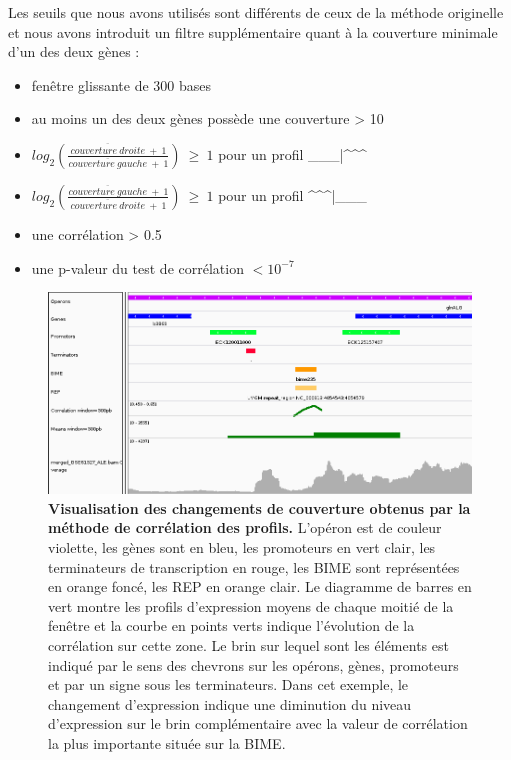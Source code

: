 \documentclass[12pt,a4paper]{report}
\begin{document}
\begin{onehalfspace}
Les seuils que nous avons utilisés sont différents de ceux de la méthode originelle et nous avons introduit un filtre supplémentaire quant à la couverture minimale d'un des deux gènes : 
\begin{itemize}[label=$\bullet$]
\item fenêtre glissante de 300 bases
\item au moins un des deux gènes possède une couverture > 10
\item $log_2(\frac{\overline{couverture~droite}~+~1}{\overline{couverture~gauche}~+~1})~\geq~1$ pour un profil \_\_\_|\^{ }\^{ }\^{ }
\item $log_2(\frac{\overline{couverture~gauche}~+~1}{\overline{couverture~droite}~+~1})~\geq~1$ pour un profil \^{ }\^{ }\^{ }|\_\_\_
\item une corrélation > 0.5
\item une p-valeur du test de corrélation $< 10^{-7}$
\end{itemize}

\begin{figure}[!h]
\centerline{\includegraphics[scale=0.53]{figures/igv_profil.png}}
\caption{\textbf{Visualisation des changements de couverture obtenus par la méthode de corrélation des profils.} L'opéron est de couleur violette, les gènes sont en bleu, les promoteurs en vert clair, les terminateurs de transcription en rouge, les BIME sont représentées en orange foncé, les REP en orange clair. Le diagramme de barres en vert montre les profils d'expression moyens de chaque moitié de la fenêtre et la courbe en points verts indique l'évolution de la corrélation sur cette zone. Le brin sur lequel sont les éléments est indiqué par le sens des chevrons sur les opérons, gènes, promoteurs et par un signe sous les terminateurs. Dans cet exemple, le changement d'expression indique une diminution du niveau d'expression sur le brin complémentaire avec la valeur de corrélation la plus importante située sur la BIME.}
\label{fig:igv_profil}
\end{figure}


\end{onehalfspace}
\end{document}
